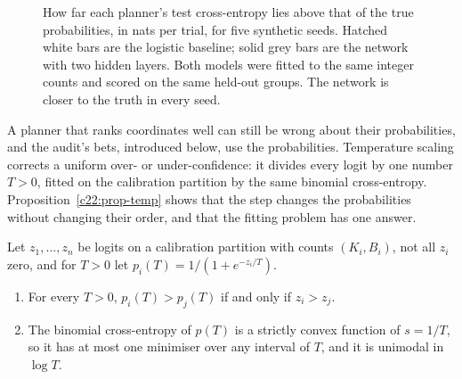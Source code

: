 \begin{figure}[ht]
\centering
{}
\caption{How far each planner's test cross-entropy lies above that of the true probabilities, in nats
per trial, for five synthetic seeds. Hatched white bars are the logistic baseline; solid grey bars are
the network with two hidden layers. Both models were fitted to the same integer counts and scored on
the same held-out groups. The network is closer to the truth in every seed.}
\label{c22:fig-depth}
\end{figure}

A planner that ranks coordinates well can still be wrong about their probabilities, and the
audit's bets, introduced below, use the probabilities. Temperature scaling \citep{guo2017}
corrects a uniform over- or under-confidence: it divides every logit by one number $T>0$, fitted on
the calibration partition by the same binomial cross-entropy. Proposition~\ref{c22:prop-temp} shows that the
step changes the probabilities without changing their order, and that the fitting problem has one
answer.

\begin{proposition}\label{c22:prop-temp}
Let $z_1,\dots,z_n$ be logits on a calibration partition with counts $(K_i,B_i)$, not all $z_i$ zero, and for $T>0$ let
$p_i(T)=1/(1+e^{-z_i/T})$.
\begin{enumerate}
\item For every $T>0$, $p_i(T)>p_j(T)$ if and only if $z_i>z_j$.
\item The binomial cross-entropy of $p(T)$ is a strictly convex function of $s=1/T$, so it has at most one minimiser over any interval of $T$, and it is unimodal in $\log T$.
\end{enumerate}
\end{proposition}

